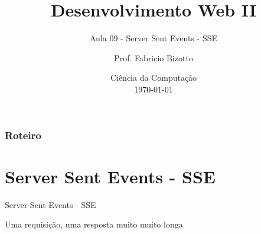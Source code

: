 \documentclass[
	9pt, %
	t, %
]{beamer}
\title[DesWebII]{Desenvolvimento Web II} %
\subtitle{Aula 09 - Server Sent Events - SSE} %
\author[Fabricio Bizotto]{Prof. Fabricio Bizotto} %
\institute[IFC]{Instituto Federal Catarinense \\ \smallskip \textit{fabricio.bizotto@ifc.edu.br}} %
\date[\today]{Ciência da Computação \\ \today} %
\begin{document}

\begin{frame}
	\titlepage %
\end{frame}


\begin{frame}
	\frametitle{Roteiro} %

	\tableofcontents %
\end{frame}


\section{Server Sent Events - SSE}

\begin{frame}
	\begin{center}

		\bigskip\bigskip\bigskip\bigskip %
		{\Large Server Sent Events - SSE}

		\bigskip\bigskip %
		{\Huge Uma requisição, uma resposta muito muito longa}

	\end{center}

\end{frame}
\end{document}
